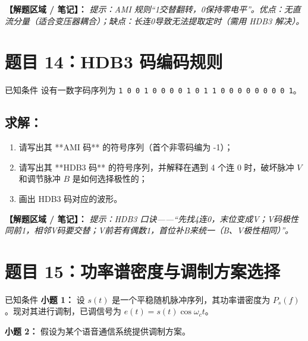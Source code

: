 \documentclass[12pt, a4paper]{article}
\begin{document}
	\noindent\textbf{【解题区域 / 笔记】：}
	\textit{提示：AMI 规则“1交替翻转，0保持零电平”。优点：无直流分量（适合变压器耦合）；缺点：长连0导致无法提取定时（需用 HDB3 解决）。}
	
	\newpage
	
	\section*{题目 14：HDB3 码编码规则}
	
	\begin{problembox}{已知条件}
		设有一数字码序列为 \texttt{1 0 0 1 0 0 0 0 1 0 1 1 0 0 0 0 0 0 0 0 1}。
	\end{problembox}
	
	\subsection*{求解：}
	\begin{enumerate}[label=(\arabic*)]
		\item 请写出其 **AMI 码** 的符号序列（首个非零码编为 -1）；
		\item 请写出其 **HDB3 码** 的符号序列，并解释在遇到 4 个连 0 时，破坏脉冲 $V$ 和调节脉冲 $B$ 是如何选择极性的；
		\item 画出 HDB3 码对应的波形。
	\end{enumerate}
	
	\noindent\textbf{【解题区域 / 笔记】：}
	\textit{提示：HDB3 口诀——“先找4连0，末位变成V；V码极性同前1，相邻V码要交替；V前若有偶数1，首位补B来统一（B、V极性相同）”。}
	
	\newpage
	
	\section*{题目 15：功率谱密度与调制方案选择}
	
	\begin{problembox}{已知条件}
		\textbf{小题 1：} 设 $s(t)$ 是一个平稳随机脉冲序列，其功率谱密度为 $P_s(f)$。现对其进行调制，已调信号为 $e(t) = s(t)\cos \omega_c t$。
		
		\vspace{0.3cm}
		\textbf{小题 2：} 假设为某个语音通信系统提供调制方案。
	\end{problembox}
	
\end{document}
